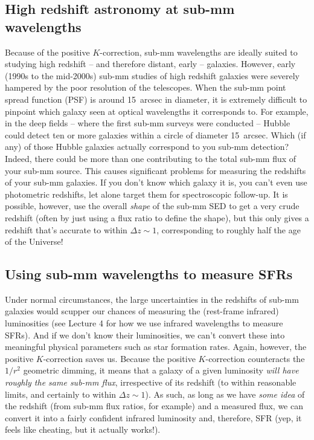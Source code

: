 \documentclass[11pt]{article}
\begin{document}
\subsection{High redshift astronomy at sub-mm wavelengths}
Because of the positive $K$-correction, sub-mm wavelengths are ideally
suited to studying high redshift -- and therefore distant, early --
galaxies. However, early (1990s to the mid-2000s) sub-mm studies of
high redshift galaxies were severely hampered by the poor resolution of
the telescopes. When the sub-mm point spread function (PSF) is around
15~arcsec in diameter, it is extremely difficult to pinpoint which
galaxy seen at optical wavelengths it corresponds to. For example, in
the deep fields -- where the first sub-mm surveys were conducted --
Hubble could detect ten or more galaxies within a circle of diameter
15~arcsec. Which (if any) of those Hubble galaxies actually correspond
to you sub-mm detection? Indeed, there could be more than one
contributing to the total sub-mm flux of your sub-mm source. This
causes significant problems for measuring the redshifts of your sub-mm
galaxies. If you don't know which galaxy it is, you can't even use
photometric redshifts, let alone target them for spectroscopic
follow-up. It is possible, however, use the overall {\it shape} of the
sub-mm SED to get a very crude redshift (often by just using a flux
ratio to define the shape), but this only gives a redshift that's
accurate to within $\Delta z \sim 1$, corresponding to roughly half
the age of the Universe!

\subsection{Using sub-mm wavelengths to measure SFRs}
Under normal circumstances, the large uncertainties in the redshifts
of sub-mm galaxies would scupper our chances of measuring the
(rest-frame infrared) luminosities (see Lecture 4 for how we use
infrared wavelengths to measure SFRs). And if we don't know their
luminosities, we can't convert these into meaningful physical
parameters such as star formation rates. Again, however, the positive
$K$-correction saves us. Because the positive $K$-correction
counteracts the $1/r^2$ geometric dimming, it means that a galaxy of a
given luminosity {\it will have roughly the same sub-mm flux},
irrespective of its redshift (to within reasonable limits, and
certainly to within $\Delta z \sim 1$). As such, as long as we have
{\it some idea} of the redshift (from sub-mm flux ratios, for example)
and a measured flux, we can convert it into a fairly confident
infrared luminosity and, therefore, SFR (yep, it feels like cheating,
but it actually works!).
\end{document}
